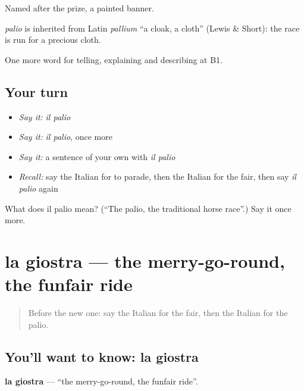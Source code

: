 Named after the prize, a painted banner.

\begin{cousinweb}
\emph{palio} is inherited from Latin \emph{pallium} \textquotedblleft{}a cloak, a cloth\textquotedblright{} (Lewis \& Short): the race is run for a precious cloth.
\end{cousinweb}

\begin{grammarlens}[title={What you've built}]
One more word for telling, explaining and describing at B1.
\end{grammarlens}

\subsection*{Your turn}
\begin{itemize}
\raggedright
  \item \emph{Say it:} \emph{il palio}
  \item \emph{Say it:} \emph{il palio}, once more
  \item \emph{Say it:} a sentence of your own with \emph{il palio}
  \item \emph{Recall:} say the Italian for to parade, then the Italian for the fair, then say \emph{il palio} again
\end{itemize}

\begin{tcolorbox}[breakable,colback=teal!4,colframe=teal!35!black,title={Before you move on}]
What does il palio mean? (\textquotedblleft{}The palio, the traditional horse race\textquotedblright{}.) Say it once more.
\end{tcolorbox}
\section[la giostra]{la giostra — the merry-go-round, the funfair ride}

\label{lesson:IT-C320-giostra}



\begin{quote}
Before the new one: say the Italian for the fair, then the Italian for the palio.
\end{quote}

\subsection*{You'll want to know: la giostra}
\textbf{la giostra} — \textquotedblleft{}the merry-go-round, the funfair ride\textquotedblright{}.

